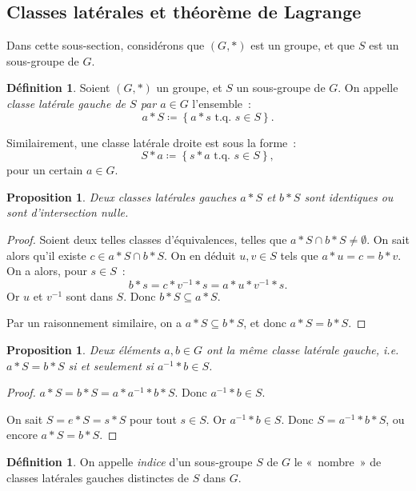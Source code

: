 \documentclass{article}
\newtheorem{prp}[thm]{Proposition}
\theoremstyle{definition}
\newtheorem{déf}[thm]{Définition}
\theoremstyle{remark}
\newcommand{\tq}{\text{ t.q. }}
\newcommand{\proofright}{{\framebox[1.5\width]{$\Rightarrow$}\hspace{.1cm}}}
\newcommand{\proofleft}{{\framebox[1.5\width]{$\Leftarrow$}\hspace{.1cm}}}
\begin{document}
	\subsection{Classes latérales et théorème de Lagrange}
		Dans cette sous-section, considérons que $(G, *)$ est un groupe, et que $S$ est un sous-groupe de $G$.

		\begin{déf} Soient $(G, *)$ un groupe, et $S$ un sous-groupe de $G$. On appelle \textit{classe latérale gauche de $S$ par $a \in G$} l'ensemble~:
		\[a*S \coloneqq \left\{a*s \tq s \in S\right\}.\]

		Similairement, une classe latérale droite est sous la forme~:
		\[S*a \coloneqq \left\{s*a \tq s \in S\right\},\]
		pour un certain $a \in G$.
		\end{déf}

		\begin{prp} Deux classes latérales gauches $a*S$ et $b*S$ sont identiques ou sont d'intersection nulle.
		\end{prp}

		\begin{proof} Soient deux telles classes d'équivalences, telles que $a*S \cap b*S \neq \emptyset$. On sait alors qu'il existe $c \in a*S \cap b*S$.
		On en déduit $u, v \in S$ tels que $a*u = c = b*v$. On a alors, pour $s \in S$~:
		\[b*s = c*v^{-1}*s = a*u*v^{-1}*s.\]
		Or $u$ et $v^{-1}$ sont dans $S$. Donc $b*S \subseteq a*S$.

		Par un raisonnement similaire, on a $a*S \subseteq b*S$, et donc $a*S = b*S$.
		\end{proof}

		\begin{prp}\label{prp:prop_classes_lat} Deux éléments $a, b \in G$ ont la même classe latérale gauche, i.e.  $a*S = b*S$ si et seulement si
		$a^{-1}*b \in S$.
		\end{prp}

		\begin{proof} \proofright $a*S = b*S = a*a^{-1}*b*S$. Donc $a^{-1}*b \in S$.

		\proofleft On sait $S = e*S = s*S$ pour tout $s \in S$. Or $a^{-1}*b \in S$. Donc $S = a^{-1}*b*S$, ou encore $a*S = b*S$.
		\end{proof}

		\begin{déf} On appelle \textit{indice} d'un sous-groupe $S$ de $G$ le «~nombre~» de classes latérales gauches distinctes de $S$ dans $G$.
		\end{déf}
\end{document}

